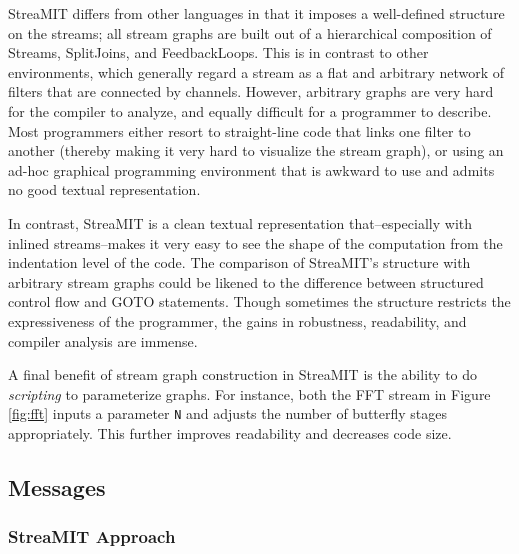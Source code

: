 StreaMIT differs from other languages in that it imposes a
well-defined structure on the streams; all stream graphs are built out
of a hierarchical composition of Streams, SplitJoins, and
FeedbackLoops.  This is in contrast to other environments, which
generally regard a stream as a flat and arbitrary network of filters
that are connected by channels.  However, arbitrary graphs are very
hard for the compiler to analyze, and equally difficult for a
programmer to describe.  Most programmers either resort to
straight-line code that links one filter to another (thereby making it
very hard to visualize the stream graph), or using an ad-hoc graphical
programming environment that is awkward to use and admits no good
textual representation.

In contrast, StreaMIT is a clean textual representation
that--especially with inlined streams--makes it very easy to see the
shape of the computation from the indentation level of the code.  The
comparison of StreaMIT's structure with arbitrary stream graphs could
be likened to the difference between structured control flow and GOTO
statements.  Though sometimes the structure restricts the
expressiveness of the programmer, the gains in robustness,
readability, and compiler analysis are immense.

A final benefit of stream graph construction in StreaMIT is the
ability to do {\it scripting} to parameterize graphs.  For instance,
both the FFT stream in Figure \ref{fig:fft} inputs a parameter {\tt N}
and adjusts the number of butterfly stages appropriately.  This
further improves readability and decreases code size.

\subsection{Messages}

\subsubsection{StreaMIT Approach}

